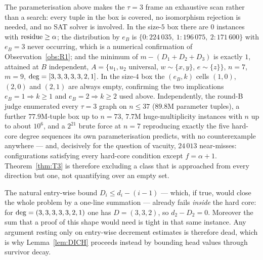 \begin{remark}[$\tau = 3$: numerical backing, and non-vacuity]\label{rem:T3num}
The parameterisation above makes the $\tau = 3$ frame an exhaustive scan rather than a
search: every tuple in the box is covered, no isomorphism rejection is needed, and no SAT
solver is involved. In the size-$5$ box there are $0$ instances with $\operatorname{residue} \ge \alpha$; the
distribution by $e_B$ is $\{0 : 224\,035,\ 1 : 196\,075,\ 2 : 171\,600\}$ with $e_B = 3$
never occurring, which is a numerical confirmation of Observation~\ref{obs:R1}; and the
minimum of $m - (D_1+D_2+D_3)$ is exactly $1$, attained at $B$ independent,
$A = \{u_1, u_2$ universal, $w \sim \{x,y\}$, $e \sim \{z\}\}$, $n = 7$, $m = 9$,
$\mathrm{deg} = [3,3,3,3,3,2,1]$. In the size-$4$ box the $(e_B,k)$ cells $(1,0)$, $(2,0)$ and
$(2,1)$ are always empty, confirming the two implications $e_B = 1 \Rightarrow k \ge 1$ and
$e_B = 2 \Rightarrow k \ge 2$ used above.
Independently, the round-B judge enumerated every $\tau = 3$ graph on $n \le 37$
($89.8$M parameter tuples), a further $77.9$M-tuple box up to $n = 73$, $7.7$M
huge-multiplicity instances with $n$ up to about $10^6$, and a $2^{21}$ brute force at
$n = 7$ reproducing exactly the five hard-core degree sequences its own parameterisation
predicts, with no counterexample anywhere --- and, decisively for the question of vacuity,
$24\,013$ near-misses: configurations satisfying every hard-core condition except
$f = \alpha+1$. Theorem~\ref{thm:T3} is therefore excluding a class that is approached from
every direction but one, not quantifying over an empty set.
\end{remark}

\begin{remark}\label{rem:decreasing}
The natural entry-wise bound $D_i \le d_i - (i-1)$ --- which, if true, would close the
whole problem by a one-line summation --- already fails \emph{inside} the hard core: for
$\mathrm{deg} = (3,3,3,3,3,2,1)$ one has $D = (3,3,2)$, so $d_2 - D_2 = 0$. Moreover the sum that a
proof of this shape would need is tight in that same instance. Any argument resting only on
entry-wise decrement estimates is therefore dead, which is why Lemma~\ref{lem:DICH}
proceeds instead by bounding head values through survivor decay.
\end{remark}

